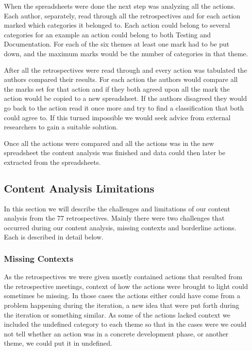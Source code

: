 When the spreadsheets were done the next step was analyzing all the actions. Each author, separately, read through all the retrospectives and for each action marked which categories it belonged to. Each action could belong to several categories for an example an action could belong to both Testing and Documentation. For each of the six themes at least one mark had to be put down, and the maximum marks would be the number of categories in that theme. 

After all the retrospectives were read through and every action was tabulated the authors compared their results. For each action the authors would compare all the marks set for that action and if they both agreed upon all the mark the action would be copied to a new spreadsheet. If the authors disagreed they would go back to the action read it once more and try to find a classification that both could agree to. If this turned impossible we would seek advice from external researchers to gain a suitable solution. 

Once all the actions were compared and all the actions was in the new spreadsheet the content analysis was finished and data could then later be extracted from the spreadsheets. 

\subsection{Content Analysis Limitations}
In this section we will describe the challenges and limitations of our content analysis from the 77 retrospectives. Mainly there were two challenges that occurred during our content analysis, missing contexts and borderline actions. Each is described in detail below. 
\subsubsection{Missing Contexts}
As the retrospectives we were given mostly contained actions that resulted from the retrospective meetings, context of how the actions were brought to light could sometimes be missing. In those cases the actions either could have come from a problem happening during the iteration, a new idea that were put forth during the iteration or something similar. As some of the actions lacked context we included the undefined category to each theme so that in the cases were we could not tell whether an action was in a concrete development phase, or another theme, we could put it in undefined. 
